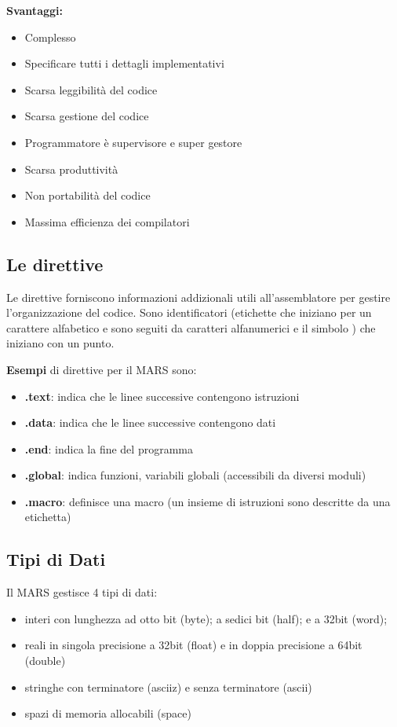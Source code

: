 \documentclass[12pt]{article}
\begin{document}
\newpage
\textbf{Svantaggi:}
\begin{itemize}
\item Complesso
\item Specificare tutti i dettagli implementativi
\item Scarsa leggibilità del codice
\item Scarsa gestione del codice 
\item Programmatore è supervisore e super gestore 
\item Scarsa produttività 
\item Non portabilità del codice 
\item Massima efficienza dei compilatori\par\medskip\noindent
\end{itemize}
\subsection{Le direttive}
Le direttive forniscono informazioni addizionali utili all’assemblatore per gestire l’organizzazione del codice. Sono identificatori (etichette che iniziano per un carattere alfabetico e sono seguiti da caratteri alfanumerici e il simbolo \textunderscore) che iniziano con un punto.\par\medskip\noindent
\textbf{Esempi} di direttive per il MARS sono: 
\begin{itemize}
\item \textbf{.text}: indica che le linee successive contengono istruzioni
\item \textbf{.data}: indica che le linee successive contengono dati 
\item \textbf{.end}: indica la fine del programma 
\item \textbf{.global}: indica funzioni, variabili globali (accessibili da diversi moduli) 
\item \textbf{.macro}: definisce una macro (un insieme di istruzioni sono descritte da una etichetta)\par\medskip\noindent 
\end{itemize}
\subsection{Tipi di Dati}
Il MARS gestisce 4 tipi di dati: 
\begin{itemize}
\item interi con lunghezza ad otto bit (byte); a sedici bit (half); e a 32bit (word); 
\item reali in singola precisione a 32bit (float) e in doppia precisione a 64bit (double) 
\item stringhe con terminatore (asciiz) e senza terminatore (ascii) 
\item spazi di memoria allocabili (space)
\end{itemize}
\end{document}

